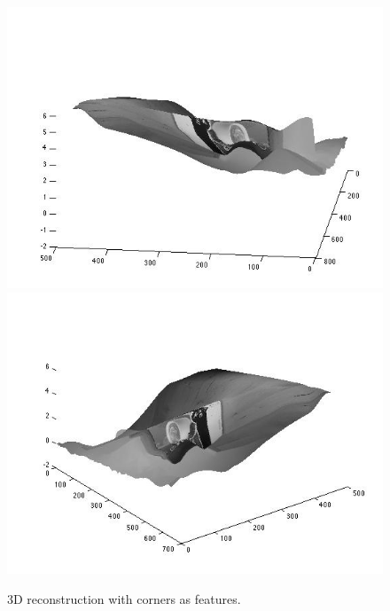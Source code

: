 \begin{figure}[H]
\begin{center}
\includegraphics[width=0.45\linewidth]{figures/kcup_corners1.jpg}
\includegraphics[width=0.45\linewidth]{figures/kcup_corners2.jpg}
\end{center}
\caption{3D reconstruction with corners as features.}
\label{kcup_corners}
\end{figure}
